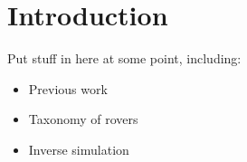 \chapter{Introduction}
\label{Chapter:Introduction}
Put stuff in here at some point, including:
\begin{itemize}
	\item Previous work
	\item Taxonomy of rovers
	\item Inverse simulation
\end{itemize}


